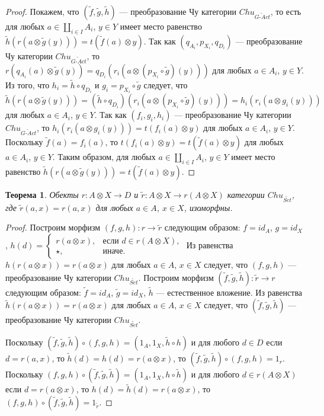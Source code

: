 \documentclass[a4paper,12pt]{article}
\newtheorem{theorem}{Теорема}
\newcommand{\GAct}{G\text{-}Act}
\begin{document}
\begin{proof}
    Покажем, что $(\tilde{f},\tilde{g},\tilde{h})$ --- преобразование Чу категории $Chu_{\widetilde{\GAct}}$, то есть для любых $a \in \coprod_{i \in I} A_i$, $y \in Y$ имеет место равенство $\tilde{h}(r(a \otimes \tilde{g}(y))) = t(\tilde{f}(a) \otimes y)$. Так как $(q_{A_i},p_{X_i},q_{D_i})$ --- преобразование Чу категории $Chu_{\widetilde{\GAct}}$, то $r(q_{A_i}(a) \otimes \tilde{g}(y)) = q_{D_i}(r_i(a \otimes (p_{X_i} \circ \tilde{g})(y)))$ для любых $a \in A_i$, $y \in Y$. Из того, что $h_i = \tilde{h} \circ q_{D_i}$ и $g_i = p_{X_i} \circ \tilde{g}$ следует, что $\tilde{h}(r(a \otimes \tilde{g}(y))) = (\tilde{h} \circ q_{D_i})(r_i(a \otimes (p_{X_i} \circ \tilde{g})(y))) = h_i(r_i(a \otimes g_i(y)))$ для любых $a \in A_i$, $y \in Y$. Так как $(f_i,g_i,h_i)$ --- преобразование Чу категории $Chu_{\widetilde{\GAct}}$, то $h_i(r_i(a \otimes g_i(y))) = t(f_i(a) \otimes y)$ для любых $a \in A_i$, $y \in Y$. Поскольку $\tilde{f}(a) = f_i(a)$, то $t(f_i(a) \otimes y) = t(\tilde{f}(a) \otimes y)$ для любых $a \in A_i$, $y \in Y$. Таким образом, для любых $a \in \coprod_{i \in I} A_i$, $y \in Y$ имеет место равенство $\tilde{h}(r(a \otimes \tilde{g}(y))) = t(\tilde{f}(a) \otimes y)$.
\end{proof}

\begin{theorem}\label{iso-gact}
    Обекты $r: A \otimes X \to D$ и $\tilde{r}: A \otimes X \to r(A \otimes X)$ категории $Chu_{\widetilde{Set}}$, где $\tilde{r}(a,x) = r(a,x)$ для любых $a \in A$, $x \in X$, изоморфны.
\end{theorem}
\begin{proof}
    Построим морфизм $(f,g,h): r \to \tilde{r}$ следующим образом: $f = id_A$, $g = id_X$, $h(d) = 
    \begin{cases}
        r(a \otimes x),& \text{если } d \in r(A \otimes X),\\
        \star,& \text{иначе}.
    \end{cases}$
    Из равенства $h(r(a \otimes x)) = r(a \otimes x)$ для любых $a \in A$, $x \in X$ следует, что $(f,g,h)$ --- преобразование Чу категории $Chu_{\widetilde{Set}}$. Построим морфизм $(\tilde{f},\tilde{g},\tilde{h}): \tilde{r} \to r$ следующим образом: $\tilde{f} = id_A$, $\tilde{g} = id_X$, $\tilde{h}$ --- естественное вложение. Из равенства $\tilde{h}(r(a \otimes x)) = r(a \otimes x)$ для любых $a \in A$, $x \in X$ следует, что $(\tilde{f},\tilde{g},\tilde{h})$ --- преобразование Чу категории $Chu_{\widetilde{Set}}$.

    Поскольку $(\tilde{f},\tilde{g},\tilde{h}) \circ (f,g,h) = (1_A,1_X,\tilde{h} \circ h)$ и для любого $d \in D$ если $d = r(a,x)$, то $\tilde{h}(d) = h(d) = r(a \otimes x)$, то $(\tilde{f},\tilde{g},\tilde{h}) \circ (f,g,h) = 1_r$. Поскольку $(f,g,h) \circ (\tilde{f},\tilde{g},\tilde{h}) = (1_A,1_X,h \circ \tilde{h})$ и для любого $d \in r(A \otimes X)$ если $d = r(a \otimes x)$, то $h(d) = \tilde{h}(d) = r(a \otimes x)$, то $(f,g,h) \circ (\tilde{f},\tilde{g},\tilde{h}) = 1_{\tilde{r}}$.
\end{proof}
\end{document}
